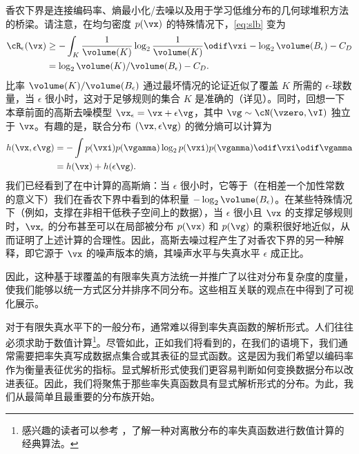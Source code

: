 \documentclass[../../book-main_zh.tex]{subfiles}
\begin{document}
\begin{remark}
    香农下界是连接编码率、熵最小化/去噪以及用于学习低维分布的几何球堆积方法的桥梁。请注意，在均匀密度 $p(\vx)$ 的特殊情况下，\eqref{eq:slb} 变为
    \begin{align}
        \cR_{\epsilon}(\vx) &\geq -\int_K \frac{1}{\volume(K)} \log_2
        \frac{1}{\volume(K)} \odif \vxi
        - \log_2 \volume(B_{\epsilon}) - C_D
        \\
        &=
        \log_2 \volume(K) / \volume(B_{\epsilon})
        - C_D. \label{eq:shannon-lower-bound-uniform}
    \end{align}
    比率 $\volume(K) / \volume(B_{\epsilon})$ 通过最坏情况的论证近似了覆盖 $K$ 所需的 $\epsilon$-球数量，当 $\epsilon$ 很小时，这对于足够规则的集合 $K$ 是准确的（详见）。同时，回想一下本章前面的高斯去噪模型 $\vx_{\epsilon} = \vx + \epsilon \vg$，其中 $\vg \sim \cN(\vzero, \vI)$ 独立于 $\vx$。有趣的是，联合分布 $(\vx, \epsilon\vg)$ 的微分熵可以计算为
    \begin{align}
        h(\vx, \epsilon\vg)
        &=
        -\int
        p(\vxi) p(\vgamma) \log_2 p(\vxi) p(\vgamma) \odif \vxi \odif \vgamma
        \\
        &=
        h(\vx) + h(\epsilon \vg).
    \end{align}
    我们已经看到了在中计算的高斯熵：当 $\epsilon$ 很小时，它等于（在相差一个加性常数的意义下）我们在香农下界中看到的体积量 $-\log_2 \volume(B_{\epsilon})$。在某些特殊情况下（例如，支撑在非相干低秩子空间上的数据），当 $\epsilon$ 很小且 $\vx$ 的支撑足够规则时，$\vx_{\epsilon}$ 的分布甚至可以在局部被分布 $p(\vx)$ 和 $p(\vg)$ 的乘积很好地近似，从而证明了上述计算的合理性。因此，高斯去噪过程产生了对香农下界的另一种解释，即它源于 $\vx$ 的噪声版本的熵，其噪声水平与失真水平 $\epsilon$ 成正比。

    因此，这种基于球覆盖的有限率失真方法统一并推广了以往对分布复杂度的度量，使我们能够以统一方式区分并排序不同分布。这些相互关联的观点在中得到了可视化展示。
\end{remark}

对于有限失真水平下的一般分布，通常难以得到率失真函数的解析形式。人们往往必须求助于数值计算\footnote{感兴趣的读者可以参考 \cite{Blahut-1972}，了解一种对离散分布的率失真函数进行数值计算的经典算法。}。尽管如此，正如我们将看到的，在我们的语境下，我们通常需要把率失真写成数据点集合或其表征的显式函数。这是因为我们希望以编码率作为衡量表征优劣的指标。显式解析形式使我们更容易判断如何变换数据分布以改进表征。因此，我们将聚焦于那些率失真函数具有显式解析形式的分布。为此，我们从最简单且最重要的分布族开始。
\end{document}
